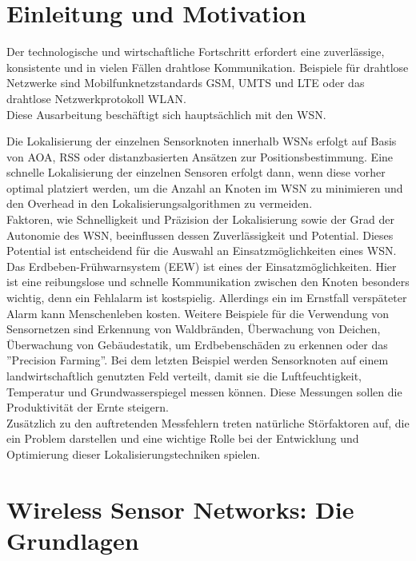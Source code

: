\documentclass[12pt, a4wide]{scrreprt}
\begin{document}
\newpage
\tableofcontents
{}

\chapter{Einleitung und Motivation}
Der technologische und wirtschaftliche Fortschritt erfordert eine zuverlässige, konsistente und in vielen Fällen drahtlose Kommunikation. Beispiele für drahtlose Netzwerke sind Mobilfunknetzstandards GSM, UMTS und LTE oder das drahtlose Netzwerkprotokoll WLAN.\\
\indent
Diese Ausarbeitung beschäftigt sich hauptsächlich mit den \ac{WSN}.

\indent
Die Lokalisierung der einzelnen Sensorknoten innerhalb WSNs erfolgt auf Basis von \ac{AOA}, \ac{RSS} oder distanzbasierten Ansätzen zur Positionsbestimmung. Eine schnelle Lokalisierung der einzelnen Sensoren erfolgt dann, wenn diese vorher optimal platziert werden, um die Anzahl an Knoten im WSN zu minimieren und den Overhead in den Lokalisierungsalgorithmen zu vermeiden\cite{area_based}.\\
\indent
Faktoren, wie Schnelligkeit und Präzision der Lokalisierung sowie der Grad der Autonomie des WSN, beeinflussen dessen Zuverlässigkeit und Potential. Dieses Potential ist entscheidend für die Auswahl an Einsatzmöglichkeiten eines WSN. Das Erdbeben-Frühwarnsystem (EEW) ist eines der Einsatzmöglichkeiten. Hier ist eine reibungslose und schnelle Kommunikation zwischen den Knoten besonders wichtig, denn ein Fehlalarm ist kostspielig. Allerdings ein im Ernstfall verspäteter Alarm kann Menschenleben kosten. Weitere Beispiele für die Verwendung von Sensornetzen sind Erkennung von Waldbränden, Überwachung von Deichen, Überwachung von Gebäudestatik, um Erdbebenschäden zu erkennen\cite{building_monitoring} oder das ''Precision Farming''. Bei dem letzten Beispiel werden Sensorknoten auf einem landwirtschaftlich genutzten Feld verteilt, damit sie die Luftfeuchtigkeit, Temperatur und Grundwasserspiegel messen können. Diese Messungen sollen die Produktivität der Ernte steigern.\\
\indent
Zusätzlich zu den auftretenden Messfehlern treten natürliche Störfaktoren auf, die ein Problem darstellen und eine wichtige Rolle bei der Entwicklung und Optimierung dieser Lokalisierungstechniken spielen.

\chapter{Wireless Sensor Networks: Die Grundlagen}
\end{document}
